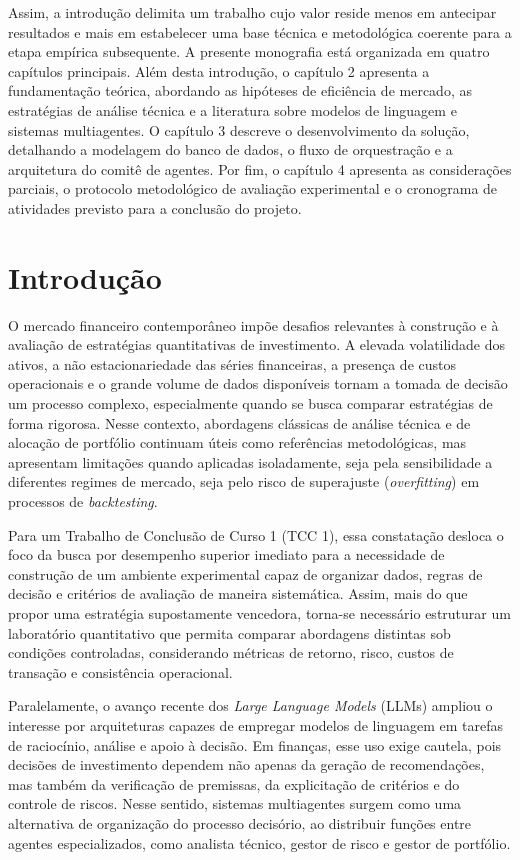 \documentclass{eic-bcc-tcc}
\begin{document}
Assim, a introdução delimita um trabalho cujo valor reside menos em antecipar resultados e mais em estabelecer uma base técnica e metodológica coerente para a etapa empírica subsequente. A presente monografia está organizada em quatro capítulos principais. Além desta introdução, o capítulo 2 apresenta a fundamentação teórica, abordando as hipóteses de eficiência de mercado, as estratégias de análise técnica e a literatura sobre modelos de linguagem e sistemas multiagentes. O capítulo 3 descreve o desenvolvimento da solução, detalhando a modelagem do banco de dados, o fluxo de orquestração e a arquitetura do comitê de agentes. Por fim, o capítulo 4 apresenta as considerações parciais, o protocolo metodológico de avaliação experimental e o cronograma de atividades previsto para a conclusão do projeto.

\chapter{Introdução}
\label{cha:introducao}

O mercado financeiro contemporâneo impõe desafios relevantes à construção e à avaliação de estratégias quantitativas de investimento. A elevada volatilidade dos ativos, a não estacionariedade das séries financeiras, a presença de custos operacionais e o grande volume de dados disponíveis tornam a tomada de decisão um processo complexo, especialmente quando se busca comparar estratégias de forma rigorosa. Nesse contexto, abordagens clássicas de análise técnica e de alocação de portfólio continuam úteis como referências metodológicas, mas apresentam limitações quando aplicadas isoladamente, seja pela sensibilidade a diferentes regimes de mercado, seja pelo risco de superajuste (\textit{overfitting}) em processos de \textit{backtesting}.

Para um Trabalho de Conclusão de Curso 1 (TCC 1), essa constatação desloca o foco da busca por desempenho superior imediato para a necessidade de construção de um ambiente experimental capaz de organizar dados, regras de decisão e critérios de avaliação de maneira sistemática. Assim, mais do que propor uma estratégia supostamente vencedora, torna-se necessário estruturar um laboratório quantitativo que permita comparar abordagens distintas sob condições controladas, considerando métricas de retorno, risco, custos de transação e consistência operacional.

Paralelamente, o avanço recente dos \textit{Large Language Models} (LLMs) ampliou o interesse por arquiteturas capazes de empregar modelos de linguagem em tarefas de raciocínio, análise e apoio à decisão. Em finanças, esse uso exige cautela, pois decisões de investimento dependem não apenas da geração de recomendações, mas também da verificação de premissas, da explicitação de critérios e do controle de riscos. Nesse sentido, sistemas multiagentes surgem como uma alternativa de organização do processo decisório, ao distribuir funções entre agentes especializados, como analista técnico, gestor de risco e gestor de portfólio.
\end{document}
